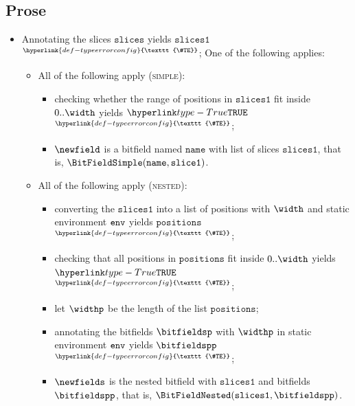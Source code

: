 \documentclass{book}
\newcommand\TypeErrorConfig[0]{\hyperlink{def-typeerrorconfig}{\texttt{\#TE}}}
\newcommand\ProseOrTypeError[0]{\hyperlink{def-proseortypeerror}{$^{\TypeErrorConfig}$}}
\newcommand\slices[0]{\texttt{slices}}
\newcommand\sliceone[0]{\texttt{slice1}}
\newcommand\slicesone[0]{\texttt{slices1}}
\newcommand\positions[0]{\texttt{positions}}
\newcommand\name[0]{\texttt{name}}
\begin{document}
\subsection{Prose}
\begin{itemize}
  \item Annotating the slices $\slices$ yields $\slicesone$ \ProseOrTypeError;
  One of the following applies:
  \begin{itemize}
    \item All of the following apply (\textsc{simple}):
    \begin{itemize}
      \item checking whether the range of positions in $\slicesone$ fit inside $0..\width$ yields $\True$ \ProseOrTypeError;
      \item $\newfield$ is a bitfield named $\name$ with list of slices $\slicesone$, that is, $\BitFieldSimple(\name, \sliceone)$.
    \end{itemize}

    \item All of the following apply (\textsc{nested}):
    \begin{itemize}
      \item converting the $\slicesone$ into a list of positions with $\width$ and static environment $\texttt{env}$
      yields $\positions$ \ProseOrTypeError;
      \item checking that all positions in $\positions$ fit inside $0..\width$ yields $\True$ \ProseOrTypeError;
      \item let $\widthp$ be the length of the list $\positions$;
      \item annotating the bitfields $\bitfieldsp$ with $\widthp$ in static environment $\texttt{env}$ yields $\bitfieldspp$ \ProseOrTypeError;
      \item $\newfields$ is the nested bitfield with $\slicesone$ and bitfields $\bitfieldspp$, that is, $\BitFieldNested(\slicesone, \bitfieldspp)$.
    \end{itemize}


\end{itemize}
\end{itemize}
\end{document}
